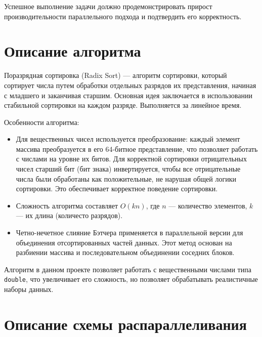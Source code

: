 \documentclass[a4paper,12pt]{article}
\begin{document}
Успешное выполнение задачи должно продемонстрировать прирост производительности параллельного подхода и подтвердить его корректность.

\newpage

\section*{\centering Описание алгоритма}

Поразрядная сортировка (Radix Sort) — алгоритм сортировки, который сортирует числа путем обработки отдельных разрядов их представления, начиная с младшего и заканчивая старшим. Основная идея заключается в использовании стабильной сортировки на каждом разряде. Выполняется за линейное время.

Особенности алгоритма:
\begin{itemize}
    \item Для вещественных чисел используется преобразование: каждый элемент массива преобразуется в его 64-битное представление, что позволяет работать с числами на уровне их битов. Для корректной сортировки отрицательных чисел старший бит (бит знака) инвертируется, чтобы все отрицательные числа были обработаны как положительные, не нарушая общей логики сортировки. Это обеспечивает корректное поведение сортировки.
    \item Сложность алгоритма составляет \(O(kn)\), где \(n\) — количество элементов, \(k\) — их длина (количесто разрядов).
    \item Четно-нечетное слияние Бэтчера применяется в параллельной версии для объединения отсортированных частей данных. Этот метод основан на разбиении массива и последовательном объединении соседних блоков.
\end{itemize}

Алгоритм в данном проекте позволяет работать с вещественными числами типа \texttt{double}, что увеличивает его сложность, но позволяет обрабатывать реалистичные наборы данных.

\newpage

\section*{\centering Описание схемы распараллеливания}
\end{document}
